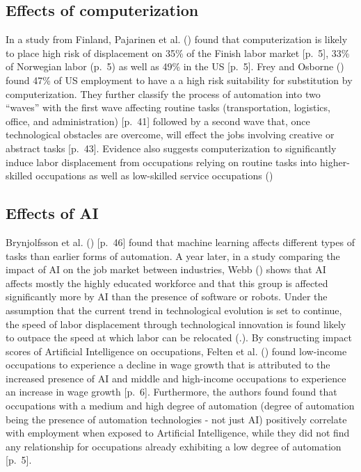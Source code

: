 \documentclass[
  11,
  a4paperpaper,
]{article}
\begin{document}
\subsection{Effects of
computerization}\label{effects-of-computerization}

In a study from Finland, Pajarinen et al.
() found that
computerization is likely to place high risk of displacement on 35\% of
the Finish labor market {[}p.~5{]}, 33\% of Norwegian labor (p.~5) as
well as 49\% in the US {[}p.~5{]}. Frey and Osborne
() found 47\% of US
employment to have a a high risk suitability for substitution by
computerization. They further classify the process of automation into
two ``waves'' with the first wave affecting routine tasks
(transportation, logistics, office, and administration) {[}p.~41{]}
followed by a second wave that, once technological obstacles are
overcome, will effect the jobs involving creative or abstract tasks
{[}p.~43{]}. Evidence also suggests computerization to significantly
induce labor displacement from occupations relying on routine tasks into
higher-skilled occupations as well as low-skilled service occupations
()

\subsection{Effects of AI}\label{effects-of-ai}

Brynjolfsson et al. ()
{[}p.~46{]} found that machine learning affects different types of tasks
than earlier forms of automation. A year later, in a study comparing the
impact of AI on the job market between industries, Webb
() shows that AI affects
mostly the highly educated workforce and that this group is affected
significantly more by AI than the presence of software or robots. Under
the assumption that the current trend in technological evolution is set
to continue, the speed of labor displacement through technological
innovation is found likely to outpace the speed at which labor can be
relocated (.). By constructing impact scores of Artificial Intelligence on
occupations, Felten et al. ()
found low-income occupations to experience a decline in wage growth that
is attributed to the increased presence of AI and middle and high-income
occupations to experience an increase in wage growth {[}p.~6{]}.
Furthermore, the authors found found that occupations with a medium and
high degree of automation (degree of automation being the presence of
automation technologies - not just AI) positively correlate with
employment when exposed to Artificial Intelligence, while they did not
find any relationship for occupations already exhibiting a low degree of
automation {[}p.~5{]}.
\end{document}
